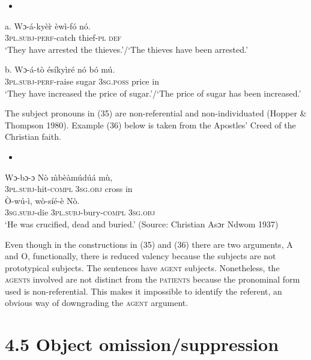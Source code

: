 \documentclass[output=paper]{langsci/langscibook}
\begin{document}
\begin{itemize}
\item \end{itemize}
\gll a.  Wɔ-\'{a}-ky\`{e}\`{r}    \`{e}w\`{i}-f\'{o}    n\'{o}.\\
       \textsc{3pl.subj}{}-\textsc{perf}{}-catch  thief-\textsc{pl}  \textsc{def}\\
\glt ‘They have arrested the thieves.’/‘The thieves have been arrested.’
\z

\gll  b.  Wɔ-\'{a}-t\`{o}    \'{e}s\'{i}ky\`{i}r\'{e}  n\'{o}    b\'{o}  m\'{u}.\\
       \textsc{3pl.subj}{}-\textsc{perf}{}-raise  sugar    \textsc{3sg.poss}  price  in\\
\glt   ‘They have increased the price of sugar.’/‘The price of sugar has been increased.’
\z

The subject pronouns in (35) are non-referential and non-individuated (Hopper \& Thompson 1980). Example (36) below is taken from the Apostles’ Creed of the Christian faith. 

\begin{itemize}
\item \end{itemize}
\gll Wɔ-bɔ-ɔ       N\`{o}    \`{m}b\`{e}\`{a}m\'{u}d\'{u}\'{a}  m\`{u}, \\
     \textsc{3pl.subj}{}-hit\textsc{{}-compl}  \textsc{3sg.obj}  cross    in\\
\gll \`{O}-w\'{u}-\`{i},     w\`{o}-s\'{i}\'{e}-\`{e}     N\`{o}.\\
     \textsc{3sg.subj}{}-die  \textsc{3pl.subj}{}-bury\textsc{{}-compl}  \textsc{3sg.obj}\\
\glt ‘He was crucified, dead and buried.’ (Source: Christian Asɔr Ndwom 1937)
\z

Even though in the constructions in (35) and (36) there are two arguments, A and O, functionally, there is reduced valency because the subjects are not prototypical subjects. The sentences have \textsc{agent} subjects. Nonetheless, the \textsc{agents} involved are not distinct from the \textsc{patients} because the pronominal form used is non-referential. This makes it impossible to identify the referent, an obvious way of downgrading the \textsc{agent} argument.

\section{4.5  Object omission/suppression }
\end{document}
